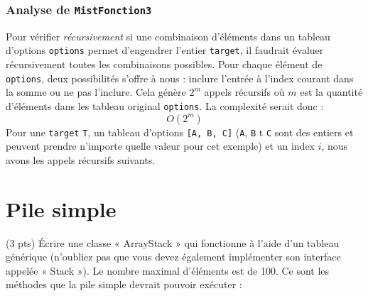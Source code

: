 \documentclass[10pt]{report}
\begin{document}
  \subsection{Analyse de {\texttt{MistFonction3}}}
  Pour vérifier \textit{récursivement}   
  si une combinaison d'éléments dans un tableau d'options \texttt{options} 
  permet d'engendrer l'entier \texttt{target}, il faudrait évaluer 
  récursivement toutes les combinaisons possibles. Pour chaque élément 
  de \texttt{options}, deux possibilités s'offre à nous : inclure l'entrée à l'index 
  courant dans la somme ou ne pas l'inclure. Cela génère $2^m$ appels récursifs 
  où $m$ est la quantité d'éléments dans les tableau original \texttt{options}.   
  La complexité serait donc :
  \[ O(2^m) \]
  Pour une \texttt{target} \texttt{T}, un tableau d'options \texttt{[A, B, C]} 
  (\texttt{A}, \texttt{B} t \texttt{C} sont des entiers et peuvent prendre n'importe quelle 
  valeur pour cet exemple) et un 
  index $i$, nous avons les appels récursifs suivants. 



    \chapter{Pile simple}
    \begin{Exercice}{(3 pts)}{}
      Écrire une classe « ArrayStack » qui fonctionne à l'aide d'un tableau 
      générique (n’oubliez pas que vous
      devez également implémenter son interface appelée « Stack »). 
      Le nombre maximal d’éléments est de
      100. Ce sont les méthodes que la pile simple devrait 
      pouvoir exécuter :
    \end{Exercice}
\end{document}

